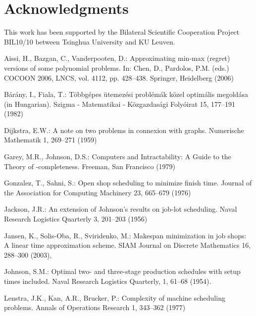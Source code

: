 \documentclass{llncs}
\numberwithin{subcase}{case}
\begin{document}
\section*{Acknowledgments}
This work has been supported by the Bilateral Scientific Cooperation Project BIL10/10 between Tsinghua University and KU Leuven.




\begin{thebibliography}{10}
\providecommand{\url}[1]{\texttt{#1}}
\providecommand{\urlprefix}{URL }

Aissi, H., Bazgan, C., Vanderpooten, D.: Approximating min-max (regret)
  versions of some polynomial problems. In: Chen, D., Pardolos, P.M. (eds.)
  COCOON 2006, LNCS, vol. 4112, pp. 428--438. Springer, Heidelberg (2006)

B{\' a}r{\' a}ny, I., Fiala, T.: T{\" o}bbg{\' e}pes {\" u}temez{\' e}si
  probl{\' e}m{\' a}k k{\" o}zel optim{\' a}lis megold{\' a}sa (in Hungarian).
  Szigma - Matematikai - K{\" o}zgazdas{\' a}gi Foly{\' o}irat  15,  177--191
  (1982)

Dijkstra, E.W.: A note on two problems in connexion with graphs. Numerische
  Mathematik  1, 269--271 (1959)

Garey, M.R., Johnson, D.S.: Computers and Intractability: A Guide to the Theory
  of -completeness. Freeman, San Francisco (1979)

Gonzalez, T., Sahni, S.: Open shop scheduling to minimize finish time. Journal
  of the Association for Computing Machinery  23,  665--679 (1976)

Jackson, J.R.: An extension of Johnson's results on job-lot scheduling. Naval
  Research Logistics Quarterly  3, 201--203 (1956)

Jansen, K., Solis-Oba, R., Sviridenko, M.: Makespan minimization in job shops:
  A linear time approximation scheme. SIAM Journal on Discrete Mathematics  16,
   288--300 (2003),

 Johnson, S.M.: Optimal two- and three-stage production schedules with setup times
  included. Naval Research Logistics Quarterly, 1, 61--68 (1954).

Lenstra, J.K., Kan, A.R., Brucker, P.: Complexity of machine scheduling
  problems. Annals of Operations Research  1,  343--362 (1977)


\end{thebibliography}
\end{document}

